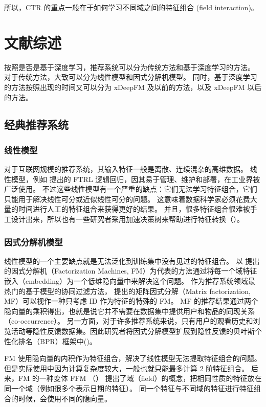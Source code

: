 \documentclass[degree=project,degree-type=project,cjk-font=noto]{thuthesis}
\begin{document}
所以，CTR 的重点一般在于如何学习不同域之间的特征组合 (field interaction)。

\chapter{文献综述}

按照是否是基于深度学习，推荐系统可以分为传统方法和基于深度学习的方法。
对于传统方法，大致可以分为线性模型和因式分解机模型。
同时，基于深度学习的方法按照出现的时间又可以分为 xDeepFM 及以前的方法，以及 xDeepFM 以后的方法。

\section{经典推荐系统}

\subsection{线性模型}

对于互联网规模的推荐系统，其输入特征一般是离散、连续混杂的高维数据。
线性模型，例如 \cite{tfrl} 提出的 FTRL 逻辑回归，因其易于管理、维护和部署，在工业界被广泛使用。
不过这些线性模型有一个严重的缺点：它们无法学习特征组合，它们只能用于解决线性可分或近似线性可分的问题。
这意味着数据科学家必须花费大量的时间进行人工的特征组合来获得更好的结果。
并且，很多特征组合很难被手工设计出来，所以也有一些研究者采用加速决策树来帮助进行特征转换（\cite{ctr_bing}）。

\subsection{因式分解机模型}

线性模型的一个主要缺点就是无法泛化到训练集中没有见过的特征组合。
以 \cite{fm} 提出的因式分解机（Factorization Machines, FM）为代表的方法通过将每一个域特征嵌入（embedding）为一个低维隐向量中来解决这个问题。
作为推荐系统领域最热门的基于模型的协同过滤方法，\cite{mf} 提出的矩阵因式分解（Matrix factorization, MF）可以视作一种只考虑 ID 作为特征的特殊的 FM。
MF 的推荐结果通过两个隐向量的乘积得出，也就是说它并不需要在数据集中提供用户和物品的同现关系（co-occurrence）。
另一方面，对于许多推荐系统来说，只有用户的观看历史和浏览活动等隐性反馈数据集。因此研究者将因式分解模型扩展到隐性反馈的贝叶斯个性化排名（BPR）框架中(\cite{vbpr})。

FM 使用隐向量的内积作为特征组合，解决了线性模型无法提取特征组合的问题。
但是实际使用中因为计算复杂度较大，一般也就只能最多计算 2 阶特征组合。
后来，FM 的一种变体 FFM （\cite{ffm}） 提出了域（field）的概念，把相同性质的特征放在同一个域（例如很多个表示日期的特征）。
同一个特征与不同域的特征进行特征组合的时候，会使用不同的隐向量。
\end{document}
